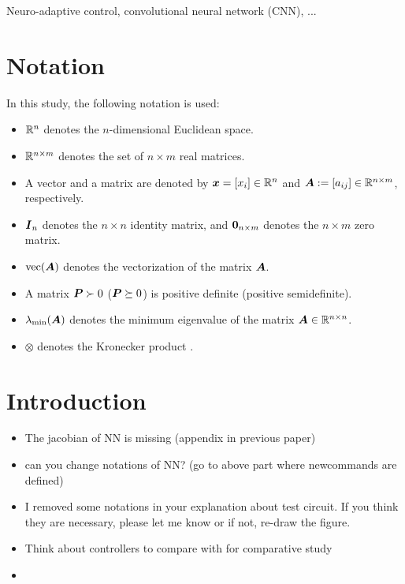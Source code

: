 \documentclass[letterpaper, journal]{IEEEtran}
\begin{document}
\begin{IEEEkeywords}
  Neuro-adaptive control, convolutional neural network (CNN), ...
\end{IEEEkeywords}







\section*{Notation}
In this study, the following notation is used:
\begin{itemize}
  \item $\mathbb{R}^n$ denotes the $n$-dimensional Euclidean space.
  \item $\mathbb{R}^{n\times m}$ denotes the set of $n\times m$ real matrices.
  \item A vector and a matrix are denoted by $\boldsymbol{x}=[x_i]\in\mathbb{R}^n$ and $\boldsymbol{A}:=[a_{ij}]\in\mathbb{R}^{n\times m}$, respectively.
  \item $\boldsymbol{I}_n$ denotes the $n\times n$ identity matrix, and $\boldsymbol{0}_{n\times
              m}$ denotes the $n\times m$ zero matrix.
  \item $\operatorname{vec}(\boldsymbol{A})$ denotes the vectorization of the matrix $\boldsymbol{A}$.
  \item A matrix $\boldsymbol{P} \succ 0$ ($\boldsymbol{P} \succeq 0$) is positive definite
          (positive semidefinite).
  \item $\lambda_{\min}(\boldsymbol{A})$ denotes the minimum eigenvalue of the matrix
          $\boldsymbol{A} \in \mathbb{R}^{n \times n}$.
  \item $\otimes$ denotes the Kronecker product \cite{Bernstein:2009aa}.
\end{itemize}


\section{Introduction}

\begin{itemize}
  \item The jacobian of NN is missing (appendix in previous paper) 
  \item can you change notations of NN? (go to above part where newcommands are defined) 
  \item I removed some notations in your explanation about test circuit. If you think they are necessary, please let me know or if not, re-draw the figure. 
  \item Think about controllers to compare with for comparative study 
  \item {} 
\end{itemize}
\end{document}
